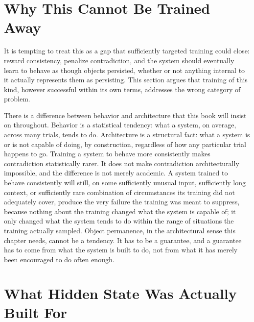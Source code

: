 \section{Why This Cannot Be Trained Away}

It is tempting to treat this as a gap that sufficiently targeted training could close: reward consistency, penalize contradiction, and the system should eventually learn to behave as though objects persisted, whether or not anything internal to it actually represents them as persisting. This section argues that training of this kind, however successful within its own terms, addresses the wrong category of problem.

There is a difference between behavior and architecture that this book will insist on throughout. Behavior is a statistical tendency: what a system, on average, across many trials, tends to do. Architecture is a structural fact: what a system is or is not capable of doing, by construction, regardless of how any particular trial happens to go. Training a system to behave more consistently makes contradiction statistically rarer. It does not make contradiction architecturally impossible, and the difference is not merely academic. A system trained to behave consistently will still, on some sufficiently unusual input, sufficiently long context, or sufficiently rare combination of circumstances its training did not adequately cover, produce the very failure the training was meant to suppress, because nothing about the training changed what the system is capable of; it only changed what the system tends to do within the range of situations the training actually sampled. Object permanence, in the architectural sense this chapter needs, cannot be a tendency. It has to be a guarantee, and a guarantee has to come from what the system is built to do, not from what it has merely been encouraged to do often enough.

\section{What Hidden State Was Actually Built For}

